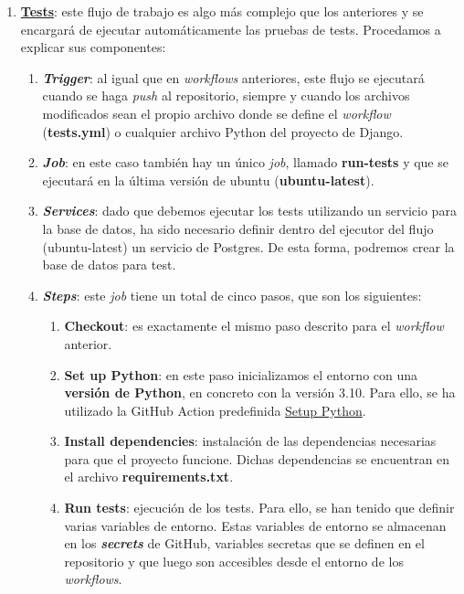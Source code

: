 \begin{enumerate}
        \item \textbf{\href{https://github.com/alexespana/TFG/actions/workflows/tests.yml}
        {Tests}}: este flujo de trabajo es algo más complejo que los anteriores y se encargará
        de ejecutar automáticamente las pruebas de tests. Procedamos a explicar sus componentes:
            \begin{enumerate}
                \item \textbf{\textit{Trigger}}: al igual que en \textit{workflows}
                anteriores, este flujo se ejecutará cuando se haga \textit{push} al
                repositorio, siempre y cuando los archivos modificados sean el propio
                archivo donde se define el \textit{workflow} (\textbf{tests.yml}) o
                cualquier archivo Python del proyecto de Django.
                \item \textbf{\textit{Job}}: en este caso también hay un único \textit{job},
                llamado \textbf{run-tests} y que se ejecutará en la última versión de
                ubuntu (\textbf{ubuntu-latest}).
                \item \textbf{\textit{Services}}: dado que debemos ejecutar los tests
                utilizando un servicio para la base de datos, ha sido necesario definir
                dentro del ejecutor del flujo (ubuntu-latest) un servicio de Postgres. De
                esta forma, podremos crear la base de datos para test.              
                \item \textbf{\textit{Steps}}: este \textit{job} tiene un total de cinco
                pasos, que son los siguientes:
                    \begin{enumerate}
                        \item \textbf{Checkout}: es exactamente el mismo paso descrito para
                        el \textit{workflow} anterior.
                        \item \textbf{Set up Python}: en este paso inicializamos el entorno
                        con una \textbf{versión de Python}, en concreto con la versión 3.10.
                        Para ello, se ha utilizado la GitHub Action predefinida
                        \href{https://github.com/marketplace/actions/setup-python}{Setup
                        Python}.
                        \item \textbf{Install dependencies}: instalación de las dependencias
                        necesarias para que el proyecto funcione. Dichas dependencias se
                        encuentran en el archivo \textbf{requirements.txt}.
                        \item \textbf{Run tests}: ejecución de los tests. Para ello, se han
                        tenido que definir varias variables de entorno. Estas variables de
                        entorno se almacenan en los \textbf{\textit{secrets}} de GitHub,
                        variables secretas que se definen en el repositorio y que luego son
                        accesibles desde el entorno de los \textit{workflows}.\\
                        

\end{enumerate}
\end{enumerate}
\end{enumerate}
